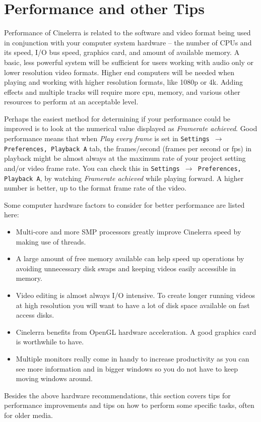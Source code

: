\chapter{Performance and other Tips}%
\label{cha:performance_tips}

Performance of Cinelerra is related to the software and video format being used in conjunction with your computer system hardware -- the number of CPUs and its speed, I/O bus speed, graphics card, and amount of available memory. A basic, less powerful system will be sufficient for users working with audio only or lower resolution video formats.  Higher end computers will be needed when playing and working with higher resolution formats, like 1080p or 4k. Adding effects and multiple tracks will require more cpu, memory, and various other resources to 
perform at an acceptable level.

Perhaps the easiest method for determining if your performance could be improved is to look at the numerical value displayed as \textit{Framerate achieved}.  Good performance means that when \textit{Play every frame} is set 
in \texttt{Settings $\rightarrow$ Preferences, Playback A} tab, the frames/second (frames per second or fps) in playback might be almost always at the maximum rate of your project setting and/or video frame rate. You can check this in \texttt{Settings $\rightarrow$ Preferences, Playback A}, by watching \textit{Framerate achieved} while playing forward.  A higher number is better, up to the format frame rate of the video.

Some computer hardware factors to consider for better performance are listed here:
\begin{itemize}
	\item Multi-core and more SMP processors greatly improve Cinelerra speed by making use of threads.
	\item A large amount of free memory available can help speed up operations by avoiding unnecessary disk
	swaps and keeping videos easily accessible in memory.
	\item Video editing is almost always I/O intensive. To create longer running videos at high resolution
	you will want to have a lot of disk space available on fast access disks.
	\item Cinelerra benefits from OpenGL hardware acceleration. A good graphics card is worthwhile to have.
	\item Multiple monitors really come in handy to increase productivity as you can see more information and
	in bigger windows so you do not have to keep moving windows around.
\end{itemize}
Besides the above hardware recommendations, this section covers tips for performance improvements and tips on how to perform some specific tasks, often for older media.

